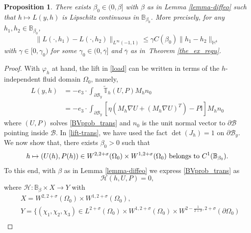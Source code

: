 \documentclass[11pt,a4paper]{amsart}
\newtheorem{proposition}{Proposition}
\theoremstyle{remark}
\theoremstyle{definition}
\numberwithin{equation}{section}
\numberwithin{proposition}{section}
\begin{document}
\begin{proposition}\label{L-incre}
	There exists $\beta_0\in (0, \beta]$ with $\beta$ as in Lemma \ref{lemma-diffeo} such that $ h\mapsto L( y, h)$ is Lipschitz continuous in $\mathbb{B}_{\beta_0}$. More precisely, for any $h_1,h_2 \in \mathbb{B}_{\beta_0}$,
\begin{equation}\label{lip-lift}
    \|L(\cdot, h_1) - L(\cdot, h_2)\|_{L^\infty(-1,1)} \leq  \gamma C(\beta_0) \|h_1-h_2\|_{\mathbb{H}^4}
\end{equation}with $\gamma \in [0,\gamma_0)$ for some $\gamma_0\in(0,\overline{\gamma}]$ and $\overline{\gamma}$ as in Theorem \ref{the_ex_regu}.
\end{proposition}
\begin{proof}
With $\varphi_h$ at hand,   the lift in \eqref{load}
can be written in terms of the $h$-independent fluid domain $\Omega_0$, namely,
    \begin{equation} \label{lift-trans}\begin{aligned}
        L(y,h)&=-e_3\cdot \int_{\partial \mathcal{B}_y}\widetilde{\mathbb{T}}_h(U, P) M_hn_0\\&=-e_3 \cdot \int_{\partial \mathcal{B}_y}  \left[\eta (M_h \nabla U + (M_h\nabla U)^T) - P\mathbb{I}\right] M_hn_0
        \end{aligned}
    \end{equation}
where $(U,P)$ solves \eqref{BVprob_trans} and $n_0$ is the  unit normal vector to $\partial \mathcal{B}$ pointing inside $\mathcal{B}$. In \eqref{lift-trans}, we have used the fact $\det(J_h)=1$ on $\partial \mathcal{B}_y$. We now show that, there exists $\beta_0>0$ such that
\begin{equation}\label{claim}\vspace{0.1em}
h\mapsto (U(h),P(h))\in W^{2, 2+\sigma}(\Omega_0) \times W^{1, 2+\sigma}(\Omega_0)\mbox{ belongs to }  C^1(\mathbb{B}_{\beta_0}).\vspace{0.1em}
\end{equation}
 To this end, with $\beta$ as in Lemma \ref{lemma-diffeo} we express \eqref{BVprob_trans} as
\begin{equation}\label{implicit}
\mathcal{H}(h,U, P)=0,
\end{equation}where  $\mathcal{H} :  \mathbb{B}_\beta\times  X \rightarrow Y$  with
\begin{equation*}\begin{aligned}
&X=W^{2, 2+\sigma}(\Omega_0)\times W^{1, 2+\sigma}(\Omega_0),\\
&Y=\bigg\{(\chi_1,\chi_2,\chi_3)\in L^{2+\sigma}(\Omega_0)\times W^{1, 2+\sigma}(\Omega_0)\times W^{2-\tfrac{1}{2+\sigma}, 2+\sigma}(\partial \Omega_0)  \\

\end{aligned}
\end{equation*}
\end{proof}
\end{document}
